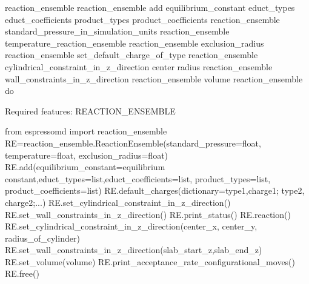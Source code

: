 \begin{essyntax}
   reaction\_ensemble
   reaction\_ensemble add equilibrium_constant  educt\_types  educt_coefficients  product\_types  product\_coefficients 
   reaction\_ensemble standard\_pressure\_in\_simulation\_units 
   reaction\_ensemble temperature\_reaction\_ensemble 
   reaction\_ensemble exclusion\_radius 
   reaction\_ensemble set\_default\_charge\_of\_type  
   reaction\_ensemble cylindrical\_constraint\_in\_z\_direction center   radius 
   reaction\_ensemble wall\_constraints\_in\_z\_direction  
   reaction\_ensemble volume 
   reaction\_ensemble do
  
  Required features: REACTION\_ENSEMBLE
  \end{essyntax}
  
  \begin{pysyntax}
  	from espressomd import reaction_ensemble
  	RE=reaction_ensemble.ReactionEnsemble(standard_pressure=float, temperature=float, exclusion_radius=float)
  	RE.add(equilibrium_constant=equilibrium constant,educt_types=list,educt_coefficients=list, product_types=list, product_coefficients=list)
  	RE.default_charges(dictionary={type1,charge1; type2, charge2;...})
  	RE.set_cylindrical_constraint_in_z_direction()
  	RE.set_wall_constraints_in_z_direction()
	RE.print_status()
	RE.reaction()
	RE.set_cylindrical_constraint_in_z_direction(center_x, center_y, radius_of_cylinder)
	RE.set_wall_constraints_in_z_direction(slab_start_z,slab_end_z)
	RE.set_volume(volume)
	RE.print_acceptance_rate_configurational_moves()
	RE.free()
	\begin{features}
	\end{features}
\end{pysyntax}
  
